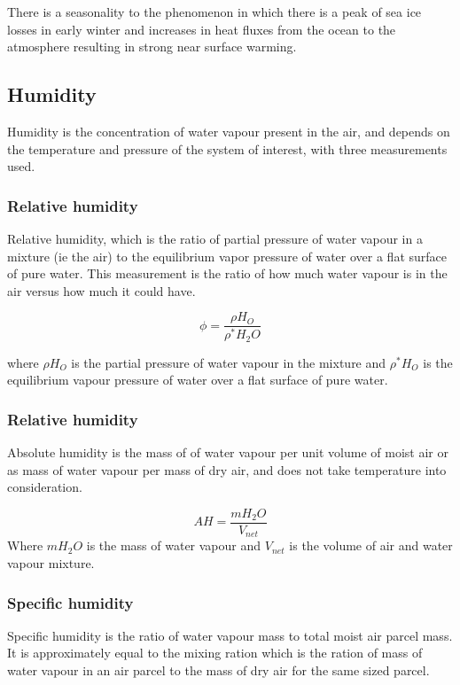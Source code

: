 \documentclass[12pt, oneside]{article}
\begin{document}
There is a seasonality to the phenomenon in which there is a peak of sea ice losses in early winter and increases in heat fluxes from the ocean to the atmosphere resulting in strong near surface warming. 

\subsection{Humidity}\label{humidity}

Humidity is the concentration of water vapour present in the air, and depends on the temperature and pressure of the system of interest, with three measurements used. 

\subsubsection{Relative humidity}
Relative humidity, which is the ratio of partial pressure of water vapour in a mixture (ie the air) to the equilibrium vapor pressure of water over a flat surface of pure water. This measurement is the ratio of how much water vapour is in the air versus how much it could have. 

\begin{equation}
    \phi = \frac{\rho H_O}{\rho^* H_2O}
\end{equation}

where $\rho H_O$ is the partial pressure of water vapour in the mixture and $\rho^* H_O$ is the equilibrium vapour pressure of water over a flat surface of pure water. 


\subsubsection{Relative humidity}
Absolute humidity is the mass of of water vapour per unit volume of moist air or as mass of water vapour per mass of dry air, and does not take temperature into consideration.

\begin{equation}
    AH = \frac{mH_2O}{V_{net}}
\end{equation}
Where $mH_2O$ is the mass of water vapour and $V_{net}$ is the volume of air and water vapour mixture. 

\subsubsection{Specific humidity}
Specific humidity is the ratio of water vapour mass to total moist air parcel mass. It is approximately equal to the mixing ration which is  the ration of mass of water vapour in an air parcel to the mass of dry air for the same sized parcel. 
\end{document}
